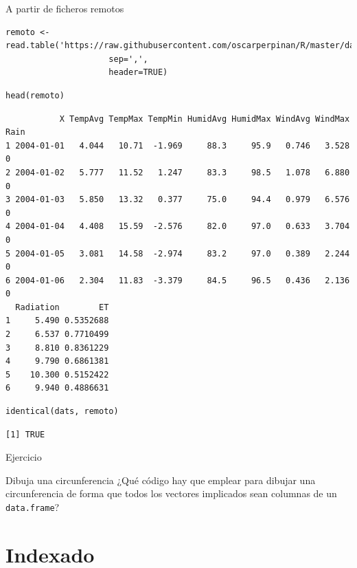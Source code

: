 \documentclass[aspectratio=169, usenames,svgnames,dvipsnames]{beamer}
\begin{document}
\begin{frame}[label={sec:orge03661a},fragile]{A partir de ficheros remotos}
 \lstset{language=r,label= ,caption= ,captionpos=b,numbers=none}
\begin{lstlisting}
remoto <- read.table('https://raw.githubusercontent.com/oscarperpinan/R/master/data/aranjuez.csv',
                     sep=',',
                     header=TRUE)
\end{lstlisting}

\lstset{language=r,label= ,caption= ,captionpos=b,numbers=none}
\begin{lstlisting}
head(remoto)
\end{lstlisting}

\begin{verbatim}
           X TempAvg TempMax TempMin HumidAvg HumidMax WindAvg WindMax Rain
1 2004-01-01   4.044   10.71  -1.969     88.3     95.9   0.746   3.528    0
2 2004-01-02   5.777   11.52   1.247     83.3     98.5   1.078   6.880    0
3 2004-01-03   5.850   13.32   0.377     75.0     94.4   0.979   6.576    0
4 2004-01-04   4.408   15.59  -2.576     82.0     97.0   0.633   3.704    0
5 2004-01-05   3.081   14.58  -2.974     83.2     97.0   0.389   2.244    0
6 2004-01-06   2.304   11.83  -3.379     84.5     96.5   0.436   2.136    0
  Radiation        ET
1     5.490 0.5352688
2     6.537 0.7710499
3     8.810 0.8361229
4     9.790 0.6861381
5    10.300 0.5152422
6     9.940 0.4886631
\end{verbatim}

\lstset{language=r,label= ,caption= ,captionpos=b,numbers=none}
\begin{lstlisting}
identical(dats, remoto)
\end{lstlisting}

\begin{verbatim}
[1] TRUE
\end{verbatim}
\end{frame}


\begin{frame}[label={sec:orgc75276c},fragile]{Ejercicio}
 \begin{block}{Dibuja una circunferencia}
¿Qué código hay que emplear para dibujar una circunferencia de forma
que todos los vectores implicados sean columnas de un \texttt{data.frame}?
\end{block}
\end{frame}


\section{Indexado}
\label{sec:org53fe2ac}
\end{document}
